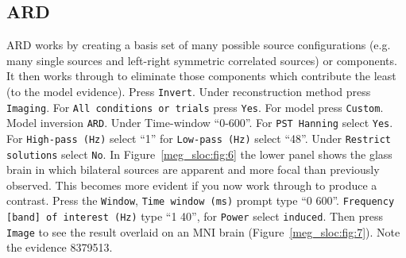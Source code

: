 \subsection{ARD}
ARD works by creating a basis set of many possible source configurations (e.g. many single sources and left-right symmetric correlated sources) or components. It then works through to eliminate those components which contribute the least (to the model evidence).
Press \texttt{Invert}. Under reconstruction method press \texttt{Imaging}. For \texttt{All conditions or trials} press \texttt{Yes}. For model press \texttt{Custom}. Model inversion \texttt{ARD}. Under Time-window ``0-600''. For \texttt{PST Hanning} select \texttt{Yes}. For \texttt{High-pass (Hz)} select ``1'' for \texttt{Low-pass (Hz)} select ``48''. Under \texttt{Restrict solutions} select \texttt{No}.  In Figure~\ref{meg_sloc:fig:6} the lower panel shows the glass brain in which bilateral sources are apparent and more focal than previously observed. This becomes more evident if you now work through to produce a contrast. Press the \texttt{Window}, \texttt{Time window (ms)} prompt type ``0 600''. \texttt{Frequency [band] of interest (Hz)} type ``1 40'', for \texttt{Power} select \texttt{induced}. Then press \texttt{Image} to see the result overlaid on an MNI brain (Figure~\ref{meg_sloc:fig:7}). Note the evidence 8379513.

